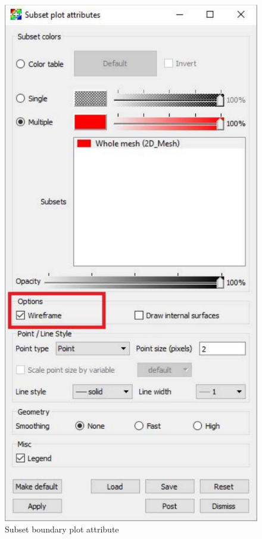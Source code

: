 \documentclass[12pt]{report}
\begin{document}
\begin{figure}
\begin{center}
\includegraphics{subsetBoundaryAtts}
\caption{Subset boundary plot attribute }
\label{figure:subsetBoundaryAtts}
\end{center}
\end{figure} 
\end{document}
